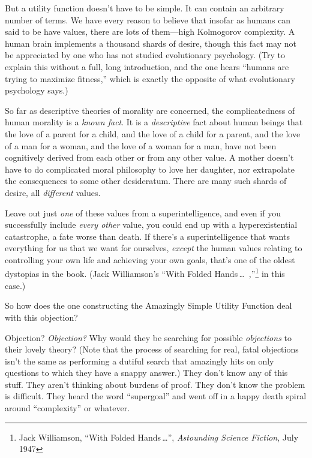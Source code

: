  But a utility function doesn't have to be simple.
It can contain an arbitrary number of terms. We have every reason to
believe that insofar as humans can said to be have values, there are
lots of them---high Kolmogorov complexity. A human brain implements a
thousand shards of desire, though this fact may not be appreciated by
one who has not studied evolutionary psychology. (Try to explain this
without a full, long introduction, and the one hears
``humans are trying to maximize
fitness,'' which is exactly the opposite of what
evolutionary psychology says.)


 So far as descriptive theories of morality are concerned, the
complicatedness of human morality is a \textit{known fact}. It is a
\textit{descriptive} fact about human beings that the love of a parent
for a child, and the love of a child for a parent, and the love of a
man for a woman, and the love of a woman for a man, have not been
cognitively derived from each other or from any other value. A mother
doesn't have to do complicated moral philosophy to love
her daughter, nor extrapolate the consequences to some other
desideratum. There are many such shards of desire, all
\textit{different} values.


 Leave out just \textit{one} of these values from a
superintelligence, and even if you successfully include \textit{every
other} value, you could end up with a hyperexistential catastrophe, a
fate worse than death. If there's a superintelligence
that wants everything for us that we want for ourselves,
\textit{except} the human values relating to controlling your own life
and achieving your own goals, that's one of the oldest
dystopias in the book. (Jack Williamson's
``With Folded Hands\,\ldots~,''\footnote{Jack Williamson, ``With Folded Hands\,\ldots'', \textit{Astounding Science Fiction}, July 1947} in
this case.)


 So how does the one constructing the Amazingly Simple Utility
Function deal with this objection?


 Objection? \textit{Objection?} Why would they be searching for
possible \textit{objections} to their lovely theory? (Note that the
process of searching for real, fatal objections isn't
the same as performing a dutiful search that amazingly hits on only
questions to which they have a snappy answer.) They
don't know any of this stuff. They
aren't thinking about burdens of proof. They
don't know the problem is difficult. They heard the
word ``supergoal'' and went off in a
happy death spiral around
``complexity'' or whatever.


